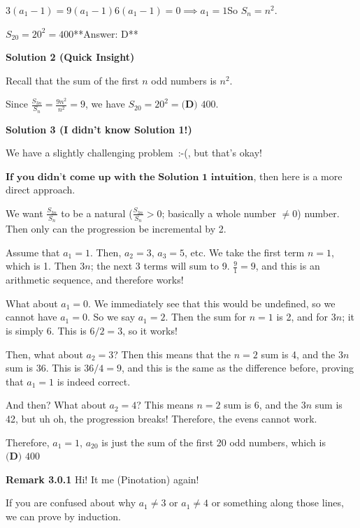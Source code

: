 \begin{enumerate}
 \(3(a_1-1)=9(a_1-1)\)\(6(a_1-1)=0 \implies a_1=1\)So \(S_n=n^2\).

 \(S_{20}=20^2=400\)**Answer: D**

 



\textbf{Solution 2 (Quick Insight)}

Recall that the sum of the first $n$ odd numbers is $n^2$.

 Since $\frac{S_{3n}}{S_{n}} = \frac{9n^2}{n^2} = 9$, we have $S_{20} = 20^2 = \boxed{\textbf{(D) } 400}$.

 



\textbf{Solution 3 (I didn't know Solution 1!)}

We have a slightly challenging problem :-(, but that's okay!

 $\textbf{If you didn't come up with the Solution 1 intuition}$, then here is a more direct approach.

 We want \(\frac{S_{3n}}{S_n}\) to be a natural (\(\frac{S_{3n}}{S_n} > 0\); basically a whole number \(\neq 0\)) number. Then only can the progression be incremental by 2.

 Assume that \(a_1 = 1\). Then, \(a_2 = 3\), \(a_3 = 5\), etc. We take the first term \(n=1\), which is 1. Then \(3n\); the next 3 terms will sum to 9. \(\frac{9}{1} = 9\), and this is an arithmetic sequence, and therefore works!

 What about \(a_1 = 0\). We immediately see that this would be undefined, so we cannot have \(a_1 = 0\). So we say \(a_1 = 2\). Then the sum for \(n=1\) is  2, and for \(3n\); it is simply 6. This is \(6/2 = 3\), so it works!

 Then, what about \(a_2 = 3\)? Then this means that the \(n=2\) sum is 4, and the \(3n\) sum is 36. This is \(36/4 = 9\), and this is the same as the difference before, proving that \(a_1 = 1\) is indeed correct.

 And then? What about \(a_2 = 4\)? This means \(n=2\) sum is 6, and the \(3n\) sum is 42, but uh oh, the progression breaks! Therefore, the evens cannot work.

 Therefore, \(a_1 = 1\), \(a_{20}\) is just the sum of the first 20 odd numbers, which is $\boxed{\textbf{(D) } 400}$

 \textbf{Remark 3.0.1} Hi! It me (Pinotation) again!

 If you are confused about why \( a_1 \neq 3 \) or \( a_1 \neq 4 \) or something along those lines, we can prove by induction.


\end{enumerate}
